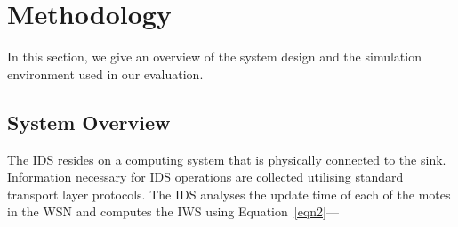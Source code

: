 \documentclass[conference,manuscript]{IEEEtran}
\begin{document}
\section{Methodology}
\label{sec:meth}
In this section, we give an overview of the system design and the simulation environment used in our evaluation. %




\subsection*{System Overview}
\label{subsec:sysdeg}
The IDS resides on a computing system that is physically connected to the sink.
Information necessary for IDS operations are collected utilising standard transport layer protocols. 
The IDS analyses the update time of  each of the motes in the WSN and computes the IWS using Equation~\ref{eqn2}---
\end{document}
